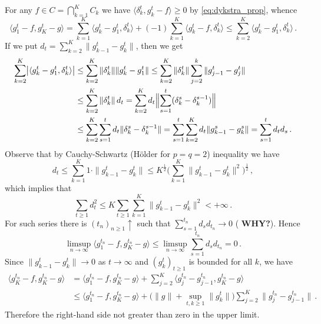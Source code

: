 \documentclass[a4paper]{article}
\begin{document}
For any $f\in C = \bigcap_{k=1}^K C_k$ we have $\langle \delta^t_k,  g^t_k - f \rangle
\geq 0$ by \eqref{eq:dykstra_prop}, whence
\begin{equation*}
  \langle g^t_1 - f, g^t_K - g \rangle
    = \sum_{k=1}^K \langle g^t_k - g^t_1, \delta^t_k \rangle
      + (-1) \sum_{k=1}^K \langle g^t_k - f, \delta^t_k \rangle
    \leq \sum_{k=2}^K \langle g^t_k - g^t_1, \delta^t_k \rangle
      \,.
\end{equation*}
If we put $d_t = \sum_{k=2}^K \| g^t_{k-1} - g^t_k \|$, then we get
\begin{align*}
  \sum_{k=2}^K \bigl\lvert \langle g^t_k - g^t_1, \delta^t_k \rangle \bigr\rvert
    &\leq \sum_{k=2}^K \|\delta^t_k\| \| g^t_k - g^t_1 \|
    \leq \sum_{k=2}^K \|\delta^t_k\| \sum_{j=2}^k \| g^t_{j-1} - g^t_j \|
    \\
    &\leq \sum_{k=2}^K \|\delta^t_k\| \, d_t
    = \sum_{k=2}^K d_t \Bigl\| \sum_{s=1}^t (\delta^s_k - \delta^{s-1}_k) \Bigr\|
    \\
    &\leq \sum_{k=2}^K \sum_{s=1}^t d_t \|\delta^s_k - \delta^{s-1}_k \|
    = \sum_{s=1}^t \sum_{k=2}^K d_t \|g^s_{k-1} - g^s_k \|
    = \sum_{s=1}^t d_t d_s
      \,.
\end{align*}
Observe that by Cauchy-Schwartz (H{\"o}lder for $p=q=2$) inequality we have
\begin{equation*}
  d_t
    \leq \sum_{k=1}^K 1 \cdot \| g^t_{k-1} - g^t_k \|
    \leq K^{\tfrac12} \biggl(
      \sum_{k=1}^K \| g^t_{k-1} - g^t_k \|^2
    \biggr)^{\tfrac12}
    \,,
\end{equation*}
which implies that
\begin{equation*}
  \sum_{t\geq 1} d^2_t
    \leq K \sum_{t\geq 1} \sum_{k=1}^K \| g^t_{k-1} - g^t_k \|^2
      < +\infty
    \,.
\end{equation*}
For such series there is $(t_n)_{n\geq1} \uparrow$ such that $\sum_{s=1}^{t_n} d_s
d_{t_n} \to 0$ ({\bf \color{red} WHY?}). Hence
\begin{equation*}
  \limsup_{n \to \infty} \langle g^{t_n}_1 - f, g^{t_n}_K - g \rangle
    \leq \limsup_{n \to \infty} \sum_{s=1}^{t_n} d_s d_{t_n}
    = 0
    \,.
\end{equation*}
Since $\|g^t_{k-1} - g^t_k \| \to 0$ as $t\to \infty$ and $(g^t_k)_{t\geq1}$ is
bounded for all $k$, we have
\begin{align*}
  \langle g^{t_n}_K - f, g^{t_n}_K - g \rangle
    &= \langle g^{t_n}_1 - f, g^{t_n}_K - g \rangle
        + \sum_{j=2}^K \langle g^{t_n}_j - g^{t_n}_{j-1}, g^{t_n}_K - g \rangle
      \\
    &\leq \langle g^{t_n}_1 - f, g^{t_n}_K - g \rangle
      + \bigl(
        \|g\| + \sup_{t,k\geq 1} \|g^t_k\|
      \bigr) \sum_{j=2}^K \|g^{t_n}_j - g^{t_n}_{j-1}\|
      \,.
\end{align*}
Therefore the right-hand side not greater than zero in the upper limit.
\end{document}
